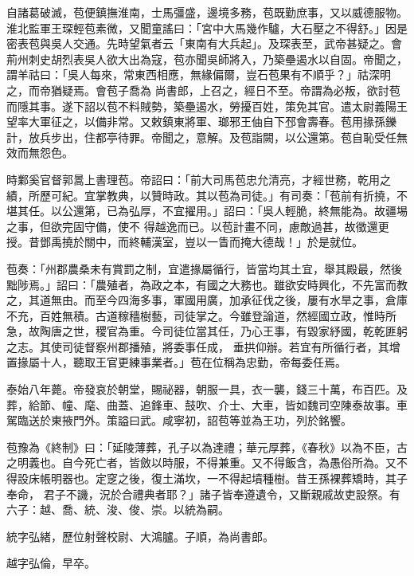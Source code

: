 \begin{pinyinscope}
 自諸葛破滅，苞便鎮撫淮南，士馬彊盛，邊境多務，苞既勤庶事，又以威德服物。淮北監軍王琛輕苞素微，又聞童謠曰：「宮中大馬幾作驢，大石壓之不得舒。」因是密表苞與吳人交通。先時望氣者云「東南有大兵起」。及琛表至，武帝甚疑之。會荊州刺史胡烈表吳人欲大出為寇，苞亦聞吳師將入，乃築壘遏水以自固。帝聞之，謂羊祜曰：「吳人每來，常東西相應，無緣偏爾，豈石苞果有不順乎？」祜深明之，而帝猶疑焉。會苞子喬為
 尚書郎，上召之，經日不至。帝謂為必叛，欲討苞而隱其事。遂下詔以苞不料賊勢，築壘遏水，勞擾百姓，策免其官。遣太尉義陽王望率大軍征之，以備非常。又敕鎮東將軍、瑯邪王伷自下邳會壽春。苞用掾孫鑠計，放兵步出，住都亭待罪。帝聞之，意解。及苞詣闕，以公還第。苞自恥受任無效而無怨色。



 時鄴奚官督郭暠上書理苞。帝詔曰：「前大司馬苞忠允清亮，才經世務，乾用之績，所歷可紀。宜掌教典，以贊時政。其以苞為司徒。」有司奏：「苞前有折撓，不堪其任。以公還第，已為弘厚，不宜擢用。」詔曰：「吳人輕脆，終無能為。故疆埸之事，但欲完固守備，使不
 得越逸而已。以苞計畫不同，慮敵過甚，故徵還更授。昔鄧禹撓於關中，而終輔漢室，豈以一眚而掩大德哉！」於是就位。



 苞奏：「州郡農桑未有賞罰之制，宜遣掾屬循行，皆當均其土宜，舉其殿最，然後黜陟焉。」詔曰：「農殖者，為政之本，有國之大務也。雖欲安時興化，不先富而教之，其道無由。而至今四海多事，軍國用廣，加承征伐之後，屢有水旱之事，倉庫不充，百姓無積。古道稼穡樹藝，司徒掌之。今雖登論道，然經國立政，惟時所急，故陶唐之世，稷官為重。今司徒位當其任，乃心王事，有毀家紓國，乾乾匪躬之志。其使司徒督察州郡播殖，將委事任成，
 垂拱仰辦。若宜有所循行者，其增置掾屬十人，聽取王官更練事業者。」苞在位稱為忠勤，帝每委任焉。



 泰始八年薨。帝發哀於朝堂，賜祕器，朝服一具，衣一襲，錢三十萬，布百匹。及葬，給節、幢、麾、曲蓋、追鋒車、鼓吹、介士、大車，皆如魏司空陳泰故事。車駕臨送於東掖門外。策謚曰武。咸寧初，詔苞等並為王功，列於銘饗。



 苞豫為《終制》曰：「延陵薄葬，孔子以為達禮；華元厚葬，《春秋》以為不臣，古之明義也。自今死亡者，皆斂以時服，不得兼重。又不得飯含，為愚俗所為。又不得設床帳明器也。定窆之後，復土滿坎，一不得起墳種樹。昔王孫裸葬矯時，其子奉命，
 君子不譏，況於合禮典者耶？」諸子皆奉遵遺令，又斷親戚故吏設祭。有六子：越、喬、統、浚、俊、崇。以統為嗣。



 統字弘緒，歷位射聲校尉、大鴻臚。子順，為尚書郎。



 越字弘倫，早卒。




\end{pinyinscope}
